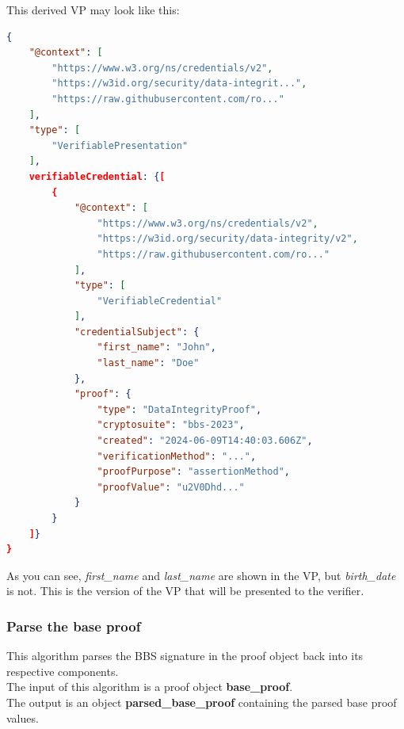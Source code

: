 \documentclass[
	a4paper               %
	,BCOR=0mm            %
	,bibliography=totoc   %
	,listof=totoc         %
	,monolingual
	,twoside=false
]{bfhthesis}              %
\begin{document}
\newpage
This derived VP may look like this:
\begin{lstlisting}[language=json,firstnumber=1,caption={Derived VP},captionpos=b]
{
	"@context": [
		"https://www.w3.org/ns/credentials/v2",
		"https://w3id.org/security/data-integrit...",
		"https://raw.githubusercontent.com/ro..."
	],
	"type": [
		"VerifiablePresentation"
	],
	verifiableCredential: {[
		{
			"@context": [
				"https://www.w3.org/ns/credentials/v2",
				"https://w3id.org/security/data-integrity/v2",
				"https://raw.githubusercontent.com/ro..."
			],
			"type": [
				"VerifiableCredential"
			],
			"credentialSubject": {
				"first_name": "John",
				"last_name": "Doe"
			},
			"proof": {
				"type": "DataIntegrityProof",
				"cryptosuite": "bbs-2023",
				"created": "2024-06-09T14:40:03.606Z",
				"verificationMethod": "...",
				"proofPurpose": "assertionMethod",
				"proofValue": "u2V0Dhd..."
			}
		}
	]}
}
\end{lstlisting}

As you can see, \textit{first\_name} and \textit{last\_name} are shown in the VP, but \textit{birth\_date} is not.
This is the version of the VP that will be presented to the verifier.

\subsubsection{Parse the base proof}
\label{subsub:parsebaseproof}
This algorithm parses the BBS signature in the proof object back into its respective components.\\

The input of this algorithm is a proof object \textbf{base\_proof}.\\

The output is an object \textbf{parsed\_base\_proof} containing the parsed base proof values.\\
\end{document}
